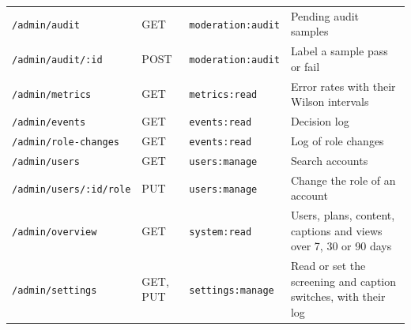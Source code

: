 \begin{footnotesize}
\begin{longtable}{>{\raggedright\arraybackslash}p{} >{\raggedright\arraybackslash}p{} >{\raggedright\arraybackslash}p{} >{\raggedright\arraybackslash}p{}}
\texttt{/admin/audit} & GET & \texttt{moderation:audit} & Pending audit samples \\
\texttt{/admin/audit/:id} & POST & \texttt{moderation:audit} & Label a sample pass or fail \\
\texttt{/admin/metrics} & GET & \texttt{metrics:read} & Error rates with their Wilson intervals \\
\texttt{/admin/events} & GET & \texttt{events:read} & Decision log \\
\texttt{/admin/role-changes} & GET & \texttt{events:read} & Log of role changes \\
\texttt{/admin/users} & GET & \texttt{users:manage} & Search accounts \\
\texttt{/admin/users/:id/role} & PUT & \texttt{users:manage} & Change the role of an account \\
\texttt{/admin/overview} & GET & \texttt{system:read} & Users, plans, content, captions and views over 7, 30 or 90 days \\
\texttt{/admin/settings} & GET, PUT & \texttt{settings:manage} & Read or set the screening and caption switches, with their log \\
\end{longtable}
\end{footnotesize}
